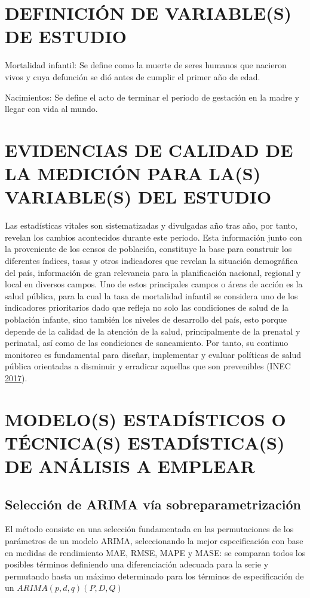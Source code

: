 \documentclass[]{article}
\begin{document}
\section{DEFINICIÓN DE VARIABLE(S) DE ESTUDIO}

Mortalidad infantil: Se define como la muerte de seres humanos que
nacieron vivos y cuya defunción se dió antes de cumplir el primer año de
edad.

Nacimientos: Se define el acto de terminar el periodo de gestación en la
madre y llegar con vida al mundo.

\section{EVIDENCIAS DE CALIDAD DE LA MEDICIÓN PARA LA(S) VARIABLE(S) DEL ESTUDIO}

Las estadísticas vitales son sistematizadas y divulgadas año tras año,
por tanto, revelan los cambios acontecidos durante este periodo. Esta
información junto con la proveniente de los censos de población,
constituye la base para construir los diferentes índices, tasas y otros
indicadores que revelan la situación demográfica del país, información
de gran relevancia para la planificación nacional, regional y local en
diversos campos. Uno de estos principales campos o áreas de acción es la
salud pública, para la cual la tasa de mortalidad infantil se considera
uno de los indicadores prioritarios dado que refleja no solo las
condiciones de salud de la población infante, sino también los niveles
de desarrollo del país, esto porque depende de la calidad de la atención
de la salud, principalmente de la prenatal y perinatal, así como de las
condiciones de saneamiento. Por tanto, su continuo monitoreo es
fundamental para diseñar, implementar y evaluar políticas de salud
pública orientadas a disminuir y erradicar aquellas que son prevenibles
(INEC \protect\hyperlink{ref-calidad_vitales}{2017}).

\section{MODELO(S) ESTADÍSTICOS O TÉCNICA(S) ESTADÍSTICA(S) DE ANÁLISIS A EMPLEAR}

\subsection{Selección de ARIMA vía sobreparametrización}

El método consiste en una selección fundamentada en las permutaciones de
los parámetros de un modelo ARIMA, seleccionando la mejor especificación
con base en medidas de rendimiento MAE, RMSE, MAPE y MASE: se comparan
todos los posibles términos definiendo una diferenciación adecuada para
la serie y permutando hasta un máximo determinado para los términos de
especificación de un \(ARIMA(p,d,q)(P,D,Q)\)
\end{document}
